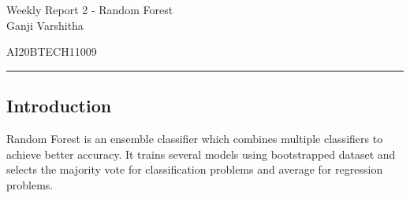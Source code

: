 \documentclass[12pt,letterpaper, onecolumn]{exam}
\begin{document}
\newtheorem{theorem}{Theorem}[section]
\newtheorem{problem}{Problem}
\newtheorem{proposition}{Proposition}[section]
\newtheorem{lemma}{Lemma}[section]
\newtheorem{corollary}[theorem]{Corollary}
\newtheorem{example}{Example}[section]
\newtheorem{definition}[problem]{Definition}

\newcommand{\BEQA}{\begin{eqnarray}}
\newcommand{\EEQA}{\end{eqnarray}}
\newcommand{\define}{\stackrel{\triangle}{=}}

\raggedbottom
\setlength{\parindent}{0pt}
\providecommand{\mbf}{\mathbf}
\providecommand{\norm}[1]{\lVert#1\rVert}
\providecommand{\pr}[1]{\ensuremath{\Pr\left(#1\right)}}
\providecommand{\qfunc}[1]{\ensuremath{Q\left(#1\right)}}
\providecommand{\sbrak}[1]{\ensuremath{{}\left[#1\right]}}
\providecommand{\lsbrak}[1]{\ensuremath{{}\left[#1\right.}}
\providecommand{\rsbrak}[1]{\ensuremath{{}\left.#1\right]}}
\providecommand{\brak}[1]{\ensuremath{\left(#1\right)}}
\providecommand{\lbrak}[1]{\ensuremath{\left(#1\right.}}
\providecommand{\rbrak}[1]{\ensuremath{\left.#1\right)}}
\providecommand{\cbrak}[1]{\ensuremath{\left\{#1\right\}}}
\providecommand{\lcbrak}[1]{\ensuremath{\left\{#1\right.}}
\providecommand{\rcbrak}[1]{\ensuremath{\left.#1\right\}}}
\let\vec\mathbf




\begingroup  
    \centering
    
    \LARGE Weekly Report 2 - Random Forest\\[0.5em]
    
    \large Ganji Varshitha\par
    \large AI20BTECH11009\par
\endgroup
\rule{\textwidth}{0.4pt}
\pointsdroppedatright   %
\printanswers
\newcommand\Solution{
  \textbf{Solution:}\\}
\newcommand{\myvec}[1]{\ensuremath{\begin{bmatrix}#1\end{bmatrix}}}

 \subsection*{Introduction}
Random Forest is an ensemble classifier which combines multiple classifiers to achieve better accuracy. It trains several models using bootstrapped dataset and selects the majority vote for classification problems and average for regression problems. 
\end{document}
